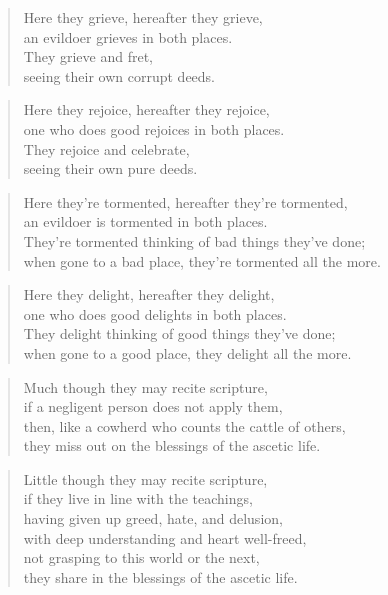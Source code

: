 \documentclass[12pt,openany]{book}%
\begin{document}
\begin{verse}%
Here they grieve, hereafter they grieve, \\
an evildoer grieves in both places. \\
They grieve and fret, \\
seeing their own corrupt deeds. 

%
\end{verse}

\begin{verse}%
Here they rejoice, hereafter they rejoice, \\
one who does good rejoices in both places. \\
They rejoice and celebrate, \\
seeing their own pure deeds. 

%
\end{verse}

\begin{verse}%
Here they’re tormented, hereafter they’re tormented, \\
an evildoer is tormented in both places. \\
They’re tormented thinking of bad things they’ve done; \\
when gone to a bad place, they’re tormented all the more. 

%
\end{verse}

\begin{verse}%
Here they delight, hereafter they delight, \\
one who does good delights in both places. \\
They delight thinking of good things they’ve done; \\
when gone to a good place, they delight all the more. 

%
\end{verse}

\begin{verse}%
Much though they may recite scripture, \\
if a negligent person does not apply them, \\
then, like a cowherd who counts the cattle of others, \\
they miss out on the blessings of the ascetic life. 

%
\end{verse}

\begin{verse}%
Little though they may recite scripture, \\
if they live in line with the teachings, \\
having given up greed, hate, and delusion, \\
with deep understanding and heart well-freed, \\
not grasping to this world or the next, \\
they share in the blessings of the ascetic life. 

%
\end{verse}
\end{document}
